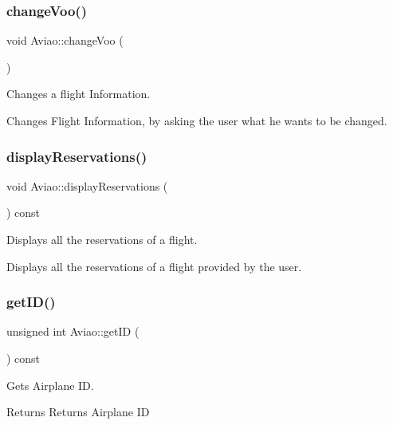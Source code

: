 \subsubsection{\texorpdfstring{change\+Voo()}{changeVoo()}}
{\footnotesize\ttfamily void Aviao\+::change\+Voo (\begin{DoxyParamCaption}{ }\end{DoxyParamCaption})}



Changes a flight Information. 

Changes Flight Information, by asking the user what he wants to be changed. \mbox{\label{class_aviao_af86ba7acbf1401b99bb0a8d17cd0d876}} 
\subsubsection{\texorpdfstring{display\+Reservations()}{displayReservations()}}
{\footnotesize\ttfamily void Aviao\+::display\+Reservations (\begin{DoxyParamCaption}{ }\end{DoxyParamCaption}) const}



Displays all the reservations of a flight. 

Displays all the reservations of a flight provided by the user. \mbox{\label{class_aviao_a1d5f6ff8f3d4190fa75549496ddf1db1}} 
\subsubsection{\texorpdfstring{get\+I\+D()}{getID()}}
{\footnotesize\ttfamily unsigned int Aviao\+::get\+ID (\begin{DoxyParamCaption}{ }\end{DoxyParamCaption}) const}



Gets Airplane ID. 

\begin{DoxyReturn}{Returns}
Returns Airplane ID 
\end{DoxyReturn}
\mbox{\label{class_aviao_a130be4a3c381f6b93c957ef91075b74e}} 
